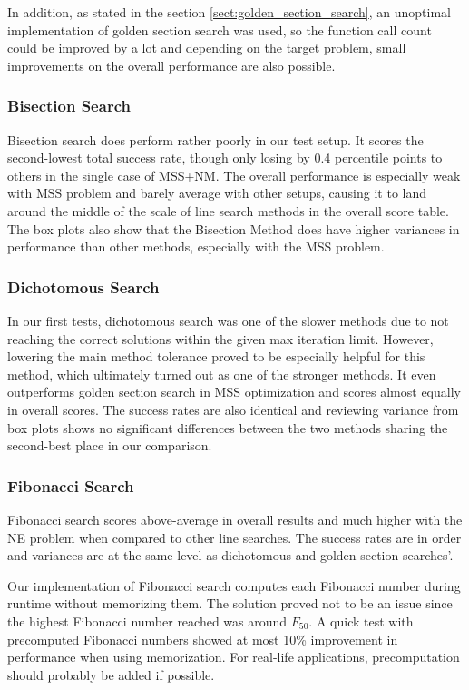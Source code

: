 \documentclass[a4paper,english,titlepage,12pt]{article}
\begin{document}
In addition, as stated in the section \ref{sect:golden_section_search}, an unoptimal implementation of golden section search was used, so the function call count could be improved by a lot and depending on the target problem, small improvements on the overall performance are also possible.

\subsubsection*{Bisection Search}

Bisection search does perform rather poorly in our test setup. It scores the second-lowest total success rate, though only losing by 0.4 percentile points to others in the single case of MSS+NM. The overall performance is especially weak with MSS problem and barely average with other setups, causing it to land around the middle of the scale of line search methods in the overall score table. The box plots also show that the Bisection Method does have higher variances in performance than other methods, especially with the MSS problem.

\subsubsection*{Dichotomous Search}

In our first tests, dichotomous search was one of the slower methods due to not reaching the correct solutions within the given max iteration limit. However, lowering the main method tolerance proved to be especially helpful for this method, which ultimately turned out as one of the stronger methods. It even outperforms golden section search in MSS optimization and scores almost equally in overall scores. The success rates are also identical and reviewing variance from box plots shows no significant differences between the two methods sharing the second-best place in our comparison.

\subsubsection*{Fibonacci Search}

Fibonacci search scores above-average in overall results and much higher with the NE problem when compared to other line searches. The success rates are in order and variances are at the same level as dichotomous and golden section searches'.

Our implementation of Fibonacci search computes each Fibonacci number during runtime without memorizing them. The solution proved not to be an issue since the highest Fibonacci number reached was around $F_{50}$. A quick test with precomputed Fibonacci numbers showed at most 10\% improvement in performance when using memorization. For real-life applications, precomputation should probably be added if possible.
\end{document}

